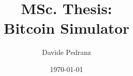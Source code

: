 \documentclass[11pt, a4paper]{report}
\title{MSc. Thesis:\\Bitcoin Simulator}
\author{Davide Pedranz}
\date{\today}
\begin{document}
\begin{titlepage}
	\maketitle
	\tableofcontents
\end{titlepage}

% 


% 
% 
% 
% 

\printbibliography
\end{document}
